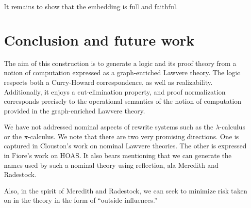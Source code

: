 \documentclass{llncs}
\renewcommand{\:}{\colon}
\newcommand{\pic}{$\pi$-calculus}
\begin{document}
It remains to show that the embedding is full and faithful.  

\section{Conclusion and future work}

The aim of this construction is to generate a logic and its proof
theory from a notion of computation expressed as a graph-enriched
Lawvere theory. The logic respects both a Curry-Howard correspondence,
as well as realizability. Additionally, it enjoys a cut-elimination
property, and proof normalization corresponds precisely to the
operational semantics of the notion of computation provided in the
graph-enriched Lawvere theory.

We have not addressed nominal aspects of rewrite systems such as the
$\lambda$-calculus or the {\pic}. We note that there are two very
promising directions. One is captured in Clouston’s work on nominal
Lawvere theories. The other is expressed in Fiore’s work on HOAS. It
also bears mentioning that we can generate the names used by such a
nominal theory using reflection, ala Meredith and Radestock.

Also, in the spirit of Meredith and Radestock, we can seek to minimize
risk taken on in the theory in the form of “outside influences.”




\end{document}
